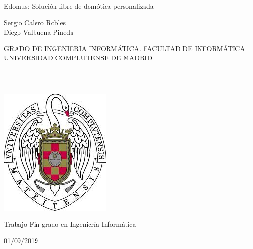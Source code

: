 \begin{center}

   \vspace{1cm}


   {\Large Edomus: Solución libre de domótica personalizada}\\

   \vspace{1cm}

   {\large
    Sergio Calero Robles\\
    Diego Valbuena Pineda\\
    }

   \vspace{0.5cm}




   GRADO DE INGENIERIA INFORMÁTICA. FACULTAD DE INFORMÁTICA\\
   UNIVERSIDAD COMPLUTENSE DE MADRID \\


   \vspace{0.65cm}
   \rule{2in}{0.5pt}\\
   \vspace{0.85cm}

  \includegraphics[height=2.5in]{figures/escudo.jpg}


   \vspace{0.5cm}
    Trabajo Fin grado en Ingeniería Informática

   \vspace{0.5cm}






  01/09/2019\\
   \vspace{1cm}

\end{center}

